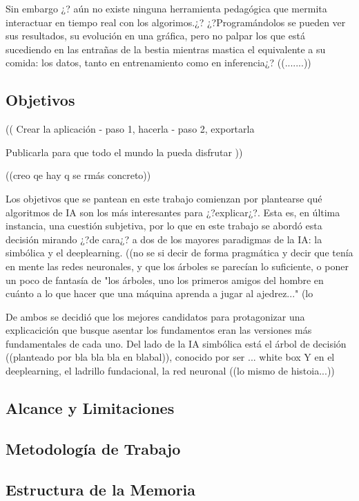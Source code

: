 Sin embargo ¿? aún no existe ninguna herramienta pedagógica que mermita interactuar en tiempo real con los algorimos.¿?
¿?Programándolos se pueden ver sus resultados, su evolución en una gráfica,
pero no palpar los que está sucediendo en las entrañas de la bestia mientras mastica el equivalente a su comida: los datos,
tanto en entrenamiento como en inferencia¿? ((.......))


\subsection{Objetivos}

((
Crear la aplicación
- paso 1, hacerla
- paso 2, exportarla

Publicarla para que todo el mundo la pueda disfrutar
))

((creo qe hay q se rmás concreto))

Los objetivos que se pantean en este trabajo comienzan por plantearse qué algoritmos de IA son los más interesantes para ¿?explicar¿?.
Esta es, en última instancia, una cuestión subjetiva,
por lo que en este trabajo se abordó esta decisión mirando ¿?de cara¿? a dos de los mayores paradigmas de la IA: la simbólica y el deeplearning.
((no se si decir de forma pragmática y decir que tenía en mente las redes neuronales, y que los árboles se parecían lo suficiente, o poner un poco de fantasía de "los árboles, uno los primeros amigos del hombre en cuánto a lo que hacer que una máquina aprenda a jugar al ajedrez..." (lo 

De ambos se decidió que los mejores candidatos para protagonizar una explicacición que busque asentar los fundamentos eran las versiones más fundamentales de cada uno.
Del lado de la IA simbólica está el árbol de decisión ((planteado por bla bla bla en blabal)), conocido por ser ... white box
Y en el deeplearning, el ladrillo fundacional, la red neuronal ((lo mismo de histoia...))


\subsection{Alcance y Limitaciones}




\subsection{Metodología de Trabajo}



\subsection{Estructura de la Memoria}

